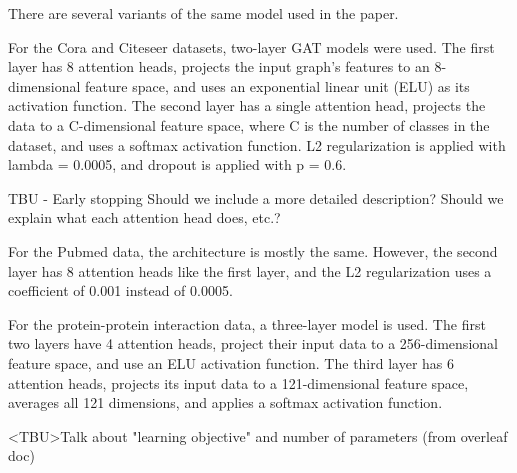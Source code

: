 There are several variants of the same model used in the paper.

For the Cora and Citeseer datasets, two-layer GAT models were used.  The first
layer has 8 attention heads, projects the input graph's features to an
8-dimensional feature space, and uses an exponential linear unit (ELU) as its
activation function.  The second layer has a single attention head, projects
the data to a C-dimensional feature space, where C is the number of classes in
the dataset, and uses a softmax activation function.  L2 regularization is
applied with lambda = 0.0005, and dropout is applied with p = 0.6.

TBU - Early stopping
Should we include a more detailed description? Should we explain what each
attention head does, etc.?

For the Pubmed data, the architecture is mostly the same. However, the second
layer has 8 attention heads like the first layer, and the L2 regularization
uses a coefficient of 0.001 instead of 0.0005.

For the protein-protein interaction data, a three-layer model is used. The
first two layers have 4 attention heads, project their input data to a
256-dimensional feature space, and use an ELU activation function. The third
layer has 6 attention heads, projects its input data to a 121-dimensional
feature space, averages all 121 dimensions, and applies a softmax activation
function.

<TBU>Talk about "learning objective" and number of parameters (from overleaf doc)
